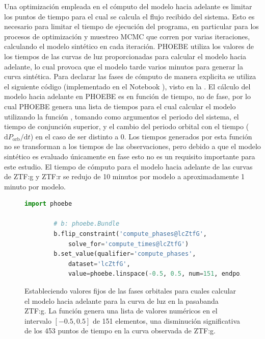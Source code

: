 Una optimización empleada en el cómputo del modelo hacia adelante es limitar los
puntos de tiempo para el cual se calcula el flujo recibido del sistema. Esto es
necesario para limitar el tiempo de ejecución del programa, en particular para
los procesos de optimización y muestreo MCMC que corren por varias iteraciones,
calculando el modelo sintético en cada iteración. PHOEBE utiliza los valores de
los tiempos de las curvas de luz proporcionadas para calcular el modelo hacia
adelante, lo cual provoca que el modelo tarde varios minutos para generar la curva
sintética. Para declarar las fases de cómputo de manera explicita se utiliza el
siguiente código (implementado en el Notebook
\href{https://github.com/KnightIV/UANL_MAPTA_PlanObservaciones/blob/main/analisis/phoebe_model/estimations/ebai-default.ipynb}{}),
visto en la . El cálculo del modelo
hacia adelante en PHOEBE es en función de tiempo, no de fase, por lo cual PHOEBE
genera una lista de tiempos para el cual calcular el modelo utilizando la
función , tomando como argumentos el periodo del
sistema, el tiempo de conjunción superior, y el cambio del periodo orbital con
el tiempo ($\mathrm{d}P_{\mathrm{orb}} / \mathrm{d}t$) en el caso de ser
distinto a 0. Los tiempos generados por esta función no se transforman a los
tiempos de las observaciones, pero debido a que el modelo sintético es evaluado
únicamente en fase esto no es un requisito importante para este estudio. El
tiempo de cómputo para el modelo hacia adelante de las curvas de ZTF:g y ZTF:r
se redujo de 10 minutos por modelo a aproximadamente 1 minuto por modelo.

\begin{figure}[!ht]
    \begin{lstlisting}[language=Python, autogobble]
        import phoebe

        # b: phoebe.Bundle
        b.flip_constraint('compute_phases@lcZtfG', 
            solve_for='compute_times@lcZtfG')
        b.set_value(qualifier='compute_phases', 
            dataset='lcZtfG', 
            value=phoebe.linspace(-0.5, 0.5, num=151, endpoint=True))
    \end{lstlisting}
    \caption{Estableciendo valores fijos de las fases orbitales para cuales
    calcular el modelo hacia adelante para la curva de luz  en la
    pasabanda ZTF:g. La función  genera una lista de
    valores numéricos en el intervalo $[-0.5, 0.5]$ de 151 elementos, una
    disminución significativa de los 453 puntos de tiempo en la curva observada
    de ZTF:g.}
    \label{codigoOptimizandoFasesComputoPhoebe}
\end{figure}

